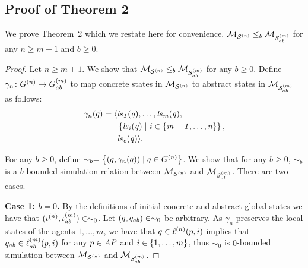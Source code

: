 \documentclass{article}
\newenvironment{customthm}[1]
  {\renewcommand\theinnercustomthm{#1}\innercustomthm}
  {\endinnercustomthm}
\begin{document}
\subsection*{Proof of Theorem 2}
We prove Theorem~2 which we restate here for convenience.
\begin{customthm}{2}
$\mathcal{M}_{\mathcal{S}^{(n)}} \leq_b \mathcal{M}_{\mathcal{S}_{ab}^{(m)}}$ for any $n \geq m+1$ and $b \geq 0$.
\end{customthm}
\begin{proof}
Let $n \geq m+1$. We show that $\mathcal{M}_{\mathcal{S}^{(n)}}
\leq_b \mathcal{M}_{\mathcal{S}_{ab}^{(m)}}$ for any $b \geq 0$.
 Define $\gamma_n
\colon G^{(n)} \rightarrow G^{(m)}_{ab}$ to map concrete states in
$\mathcal{M}_{\mathcal{S}^{(n)}}$ to abstract states in $\mathcal{M}_{\mathcal{S}_{ab}^{(m)}}$ as follows:
\begin{align*}
  \gamma_n(q) =  \langle &\it{ls}_{1}(q), \ldots, \it{ls}_{m}(q), \\
  &\left \{ \it{ls}_{i}(q) \mid i \in \left \{ m + 1, \ldots, n \right \} \right \}, \\
  &\it{ls}_{e}(q)  \rangle.
\end{align*}

For any $b \geq 0$, define $\sim_b = \left \{ (q, \gamma_n(q)) \mid q \in
    G^{(n)}  \right \}$. We show that for any $b \geq 0$, $\sim_b$ is a
    $b$-bounded simulation relation between $\mathcal{M}_{\mathcal{S}^{(n)}}$ and $\mathcal{M}_{\mathcal{S}_{ab}^{(m)}}$. There are
    two cases.


{\bf Case 1: $b=0$.} By the definitions of
    initial concrete and abstract global states we have that $(\iota^{({n})},
    \iota^{({m})}_{ab}) \in \sim_0$. Let $(q, q_{ab}) \in \sim_0$
be arbitrary. As $\gamma_n$ preserves the local states of the agents $1, \ldots,
m$, we have that $q \in \ell^{(n)}(p, i)$ implies that $q_{ab} \in
\ell^{(m)}_{ab}(p, i)$ for any $p \in \it{AP}$ and $i \in \left \{ 1, \ldots, m \right \}$, thus
$\sim_0$ is $0$-bounded simulation between $\mathcal{M}_{\mathcal{S}^{(n)}}$ and $\mathcal{M}_{\mathcal{S}_{ab}^{(m)}}$.  


\end{proof}
\end{document}
